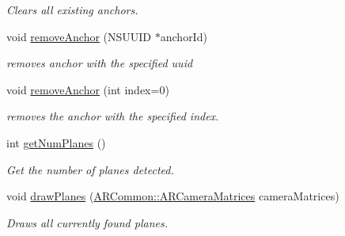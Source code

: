 \begin{DoxyCompactItemize}
\begin{DoxyCompactList}\small\item\em Clears all existing anchors. \end{DoxyCompactList}\item 
\mbox{\label{class_a_r_core_1_1_a_r_anchor_manager_a28ed88e530bc1991e59f26e6b580d5c5}} 
void \hyperlink{class_a_r_core_1_1_a_r_anchor_manager_a28ed88e530bc1991e59f26e6b580d5c5}{remove\+Anchor} (N\+S\+U\+U\+ID $\ast$anchor\+Id)
\begin{DoxyCompactList}\small\item\em removes anchor with the specified uuid \end{DoxyCompactList}\item 
\mbox{\label{class_a_r_core_1_1_a_r_anchor_manager_a471d6e5694d6aecb810b65a909cf72b1}} 
void \hyperlink{class_a_r_core_1_1_a_r_anchor_manager_a471d6e5694d6aecb810b65a909cf72b1}{remove\+Anchor} (int index=0)
\begin{DoxyCompactList}\small\item\em removes the anchor with the specified index. \end{DoxyCompactList}\item 
\mbox{\label{class_a_r_core_1_1_a_r_anchor_manager_a1da3445edbf4474d1207d30b691cfb4f}} 
int \hyperlink{class_a_r_core_1_1_a_r_anchor_manager_a1da3445edbf4474d1207d30b691cfb4f}{get\+Num\+Planes} ()
\begin{DoxyCompactList}\small\item\em Get the number of planes detected. \end{DoxyCompactList}\item 
\mbox{\label{class_a_r_core_1_1_a_r_anchor_manager_a7ec2178e8754fa04b00cc600c60cb852}} 
void \hyperlink{class_a_r_core_1_1_a_r_anchor_manager_a7ec2178e8754fa04b00cc600c60cb852}{draw\+Planes} (\hyperlink{struct_a_r_common_1_1_a_r_camera_matrices}{A\+R\+Common\+::\+A\+R\+Camera\+Matrices} camera\+Matrices)
\begin{DoxyCompactList}\small\item\em Draws all currently found planes. \end{DoxyCompactList}\item 
\mbox{\label{class_a_r_core_1_1_a_r_anchor_manager_af4b19656d608761d25661d6720a4c2f3}} 

\end{DoxyCompactItemize}
